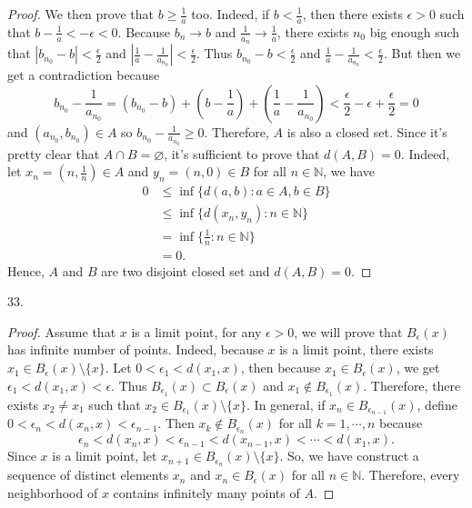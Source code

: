 \documentclass[12pt, a4paper]{article}
\theoremstyle{plain}
\newcommand{\N}{\mathbb{N}}
\begin{document}
\begin{proof}
    We then prove that $b\geq \frac{1}{a}$ too. Indeed, if $b<\frac{1}{a}$, then there exists $\epsilon>0$ such that $b-\frac{1}{a}<-\epsilon<0$. Because $b_n\rightarrow b$ and $\frac{1}{a_n}\rightarrow\frac{1}{a}$, there exists $n_0$ big enough such that $|b_{n_0}-b|<\frac{\epsilon}{2}$ and $|\frac{1}{a}-\frac{1}{a_{n_0}}|<\frac{\epsilon}{2}$. Thus $b_{n_0}-b<\frac{\epsilon}{2}$ and $\frac{1}{a}-\frac{1}{a_{n_0}}<\frac{\epsilon}{2}$. But then we get a contradiction because
    \[
    b_{n_0}-\frac{1}{a_{n_0}}=(b_{n_0}-b)+\left(b-\frac{1}{a}\right)+\left(\frac{1}{a}-\frac{1}{a_{n_0}}\right)<\frac{\epsilon}{2}-\epsilon+\frac{\epsilon}{2}=0
    \]
    and $(a_{n_0},b_{n_0})\in A$ so $b_{n_0}-\frac{1}{a_{n_0}}\geq0$. Therefore, $A$ is also a closed set. Since it's pretty clear that $A\cap B=\varnothing$, it's sufficient to prove that $d(A,B)=0$. Indeed, let $x_n=(n,\frac{1}{n})\in A$ and $y_n=(n,0)\in B$ for all $n\in\N$, we have
    \begin{align*}
        0&\leq \inf\{d(a,b):a\in A,b\in B\}\\
        &\leq \inf\{d(x_n,y_n):n\in \N\}\\
        &=\inf\{\frac{1}{n}:n\in\N\}\\
        &= 0.
    \end{align*}
    Hence, $A$ and $B$ are two disjoint closed set and $d(A,B)=0$.
    \end{proof}

33.
\begin{proof}
Assume that $x$ is a limit point, for any $\epsilon>0$, we will prove that $B_\epsilon(x)$ has infinite number of points. Indeed, because $x$ is a limit point, there exists $x_1\in B_\epsilon(x)\setminus \{x\}$. Let $0<\epsilon_1<d(x_1,x)$, then because $x_1\in B_\epsilon(x)$, we get $\epsilon_1<d(x_1,x)<\epsilon$. Thus $B_{\epsilon_1}(x)\subset B_\epsilon(x)$ and $x_1\notin B_{\epsilon_1}(x)$. Therefore, there exists $x_2\neq x_1$ such that $x_2\in B_{\epsilon_1}(x)\setminus \{x\}$. In general, if $x_n\in B_{\epsilon_{n-1}}(x)$, define $0<\epsilon_n<d(x_n,x)<\epsilon_{n-1}$.  Then $x_k\notin B_{\epsilon_{n}}(x)$ for all $k=1,\cdots ,n$ because
\[
\epsilon_n<d(x_n,x)<\epsilon_{n-1}<d(x_{n-1},x)<\cdots <d(x_1,x).
\]
Since $x$ is a limit point, let $x_{n+1}\in B_{\epsilon_n}(x)\setminus \{x\}$. So, we have construct a sequence of distinct elements $x_n$ and $x_n\in B_\epsilon(x)$ for all $n\in\N$. Therefore, every neighborhood of $x$ contains infinitely many points of $A$.
\end{proof}
\end{document}
